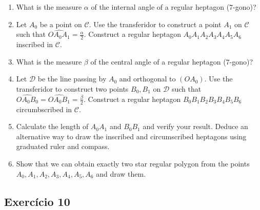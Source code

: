 \begin{enumerate}
\item What is the measure $\alpha$ of the internal angle of a regular heptagon
  ($7$-gono)?
\item Let $A_0$ be a point on $\mathcal C$. Use the transferidor to construct
  a point $A_1$ on $\mathcal C$ such that
  $\widehat{OA_0A_1} = \frac{\alpha}{2}$. Construct a regular heptagon
  $A_0A_1A_2A_3A_4A_5A_6$ inscribed in $\mathcal C$.
\item What is the measure $\beta$ of the central angle of a regular heptagon
  ($7$-gono)?
\item Let $\mathcal D$ be the line passing by $A_0$ and orthogonal to
  $(OA_0)$. Use the transferidor to construct
  two points $B_0, B_1$ on $\mathcal D$ such that
  $\widehat{OA_0B_0} = \widehat{OA_0B_1} = \frac{\beta}{2}$.
  Construct a regular heptagon
  $B_0B_1B_2B_3B_4B_5B_6$ circumbscribed in $\mathcal C$.
\item Calculate the length of $A_0A_1$ and $B_0B_1$ and verify your result.
  Deduce an alternative way to draw the inscribed and circumscribed heptagons
  using graduated ruler and compass.
\item Show that we can obtain exactly two star regular polygon from the
  points $A_0, A_1, A_2, A_3, A_4, A_5, A_6$ and draw them.
\end{enumerate}

\subsection{Exercício 10}


